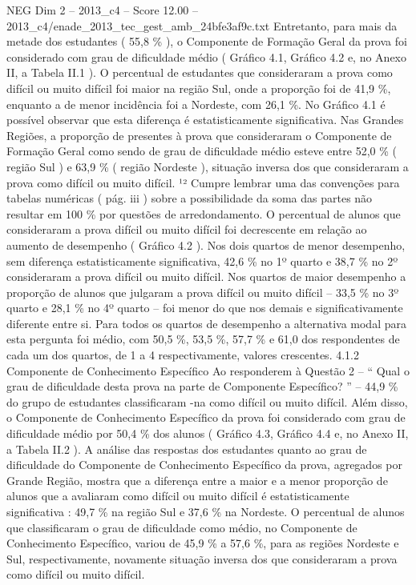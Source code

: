 \begin{textsample}{NEG Dim 2 – 2013\_c4 – Score 12.00 – 2013\_c4/enade\_2013\_tec\_gest\_amb\_24bfe3af9c.txt}
Entretanto, para mais da metade dos estudantes ( 55,8 \% ), o Componente de Formação Geral da prova foi considerado com grau de dificuldade médio ( Gráfico 4.1, Gráfico 4.2 e, no Anexo II, a Tabela II.1 ).
O percentual de estudantes que consideraram a prova como difícil ou muito difícil foi maior na região Sul, onde a proporção foi de 41,9 \%, enquanto a de menor incidência foi a Nordeste, com 26,1 \%.
No Gráfico 4.1 é possível observar que esta diferença é estatisticamente significativa.
Nas Grandes Regiões, a proporção de presentes à prova que consideraram o Componente de Formação Geral como sendo de grau de dificuldade médio esteve entre 52,0 \% ( região Sul ) e 63,9 \% ( região Nordeste ), situação inversa dos que consideraram a prova como difícil ou muito difícil. ¹² Cumpre lembrar uma das convenções para tabelas numéricas ( pág. iii ) sobre a possibilidade da soma das partes não resultar em 100 \% por questões de arredondamento.
O percentual de alunos que consideraram a prova difícil ou muito difícil foi decrescente em relação ao aumento de desempenho ( Gráfico 4.2 ).
Nos dois quartos de menor desempenho, sem diferença estatisticamente significativa, 42,6 \% no 1º quarto e 38,7 \% no 2º consideraram a prova difícil ou muito difícil.
Nos quartos de maior desempenho a proporção de alunos que julgaram a prova difícil ou muito difícil – 33,5 \% no 3º quarto e 28,1 \% no 4º quarto – foi menor do que nos demais e significativamente diferente entre si.
Para todos os quartos de desempenho a alternativa modal para esta pergunta foi médio, com 50,5 \%, 53,5 \%, 57,7 \% e 61,0 dos respondentes de cada um dos quartos, de 1 a 4 respectivamente, valores crescentes. 4.1.2 Componente de Conhecimento Específico Ao responderem à Questão 2 – “ Qual o grau de dificuldade desta prova na parte de Componente Específico? ” – 44,9 \% do grupo de estudantes classificaram -na como difícil ou muito difícil.
Além disso, o Componente de Conhecimento Específico da prova foi considerado com grau de dificuldade médio por 50,4 \% dos alunos ( Gráfico 4.3, Gráfico 4.4 e, no Anexo II, a Tabela II.2 ).
A análise das respostas dos estudantes quanto ao grau de dificuldade do Componente de Conhecimento Específico da prova, agregados por Grande Região, mostra que a diferença entre a maior e a menor proporção de alunos que a avaliaram como difícil ou muito difícil é estatisticamente significativa : 49,7 \% na região Sul e 37,6 \% na Nordeste.
O percentual de alunos que classificaram o grau de dificuldade como médio, no Componente de Conhecimento Específico, variou de 45,9 \% a 57,6 \%, para as regiões Nordeste e Sul, respectivamente, novamente situação inversa dos que consideraram a prova como difícil ou muito difícil.

\end{textsample}
